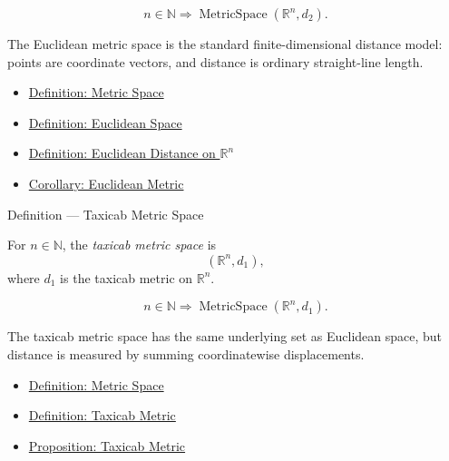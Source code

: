 \begin{remark*}
\[
n\in\mathbb{N}
\Longrightarrow
\operatorname{MetricSpace}(\mathbb{R}^n,d_2).
\]
\end{remark*}

\begin{remark*}[Interpretation]
The Euclidean metric space is the standard finite-dimensional distance model:
points are coordinate vectors, and distance is ordinary straight-line length.
\end{remark*}

\begin{dependencies}
\begin{itemize}
  \item \hyperref[def:metric-space]{Definition: Metric Space}
  \item \hyperref[def:euclidean-space]{Definition: Euclidean Space}
  \item \hyperref[def:euclidean-distance-rn]{Definition: Euclidean Distance on \(\mathbb{R}^n\)}
  \item \hyperref[cor:euclidean-metric]{Corollary: Euclidean Metric}
\end{itemize}
\end{dependencies}

\begin{definitionbox}{Definition --- Taxicab Metric Space}
\begin{definition}\label{def:taxicab-metric-space}
For \(n\in\mathbb{N}\), the \emph{taxicab metric space} is
\[
  (\mathbb{R}^n,d_1),
\]
where \(d_1\) is the taxicab metric on \(\mathbb{R}^n\).
\end{definition}
\end{definitionbox}

\begin{remark*}
\[
n\in\mathbb{N}
\Longrightarrow
\operatorname{MetricSpace}(\mathbb{R}^n,d_1).
\]
\end{remark*}

\begin{remark*}[Interpretation]
The taxicab metric space has the same underlying set as Euclidean space, but
distance is measured by summing coordinatewise displacements.
\end{remark*}

\begin{dependencies}
\begin{itemize}
  \item \hyperref[def:metric-space]{Definition: Metric Space}
  \item \hyperref[def:taxicab-metric-rn]{Definition: Taxicab Metric}
  \item \hyperref[prop:taxicab-metric-rn]{Proposition: Taxicab Metric}
\end{itemize}
\end{dependencies}


